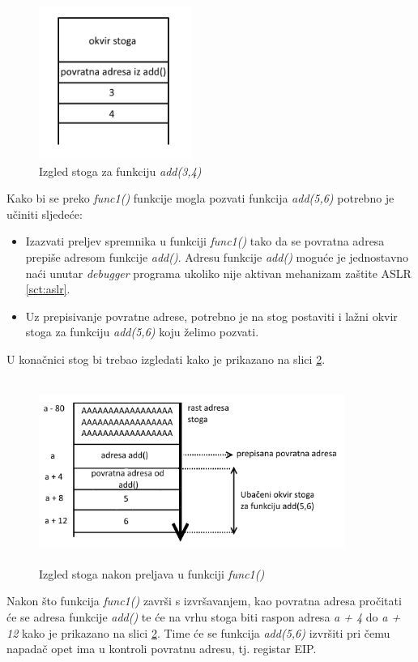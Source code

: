 \documentclass[times, utf8, diplomski, numeric]{fer}
\begin{document}
\begin{figure}[!htb]
\centering
\setlength\fboxsep{0pt}
\setlength\fboxrule{0.5pt}
\includegraphics[width=5cm, height=5cm]{slike/rop_add34}
\caption{Izgled stoga za funkciju \emph{add(3,4)}}
\label{fig:rop_add34} 
\end{figure}
Kako bi se preko \emph{func1()} funkcije mogla pozvati funkcija \emph{add(5,6)} potrebno je učiniti sljedeće:
\begin{itemize}
\item Izazvati preljev spremnika u funkciji \emph{func1()} tako da se povratna adresa prepiše adresom funkcije \emph{add()}. Adresu funkcije \emph{add()} moguće je jednostavno naći unutar \emph{debugger} programa ukoliko nije aktivan mehanizam zaštite ASLR \ref{sct:aslr}.
\item Uz prepisivanje povratne adrese, potrebno je na stog postaviti i lažni okvir stoga za funkciju \emph{add(5,6)} koju želimo pozvati.
\end{itemize}
U konačnici stog bi trebao izgledati kako je prikazano na slici \ref{fig:rop_add56}.

\begin{figure}[!htb]
\centering
\setlength\fboxsep{0pt}
\setlength\fboxrule{0.5pt}
\includegraphics[width=10cm, height=6cm]{slike/rop_add56}
\caption{Izgled stoga nakon preljava u funkciji \emph{func1()}}
\label{fig:rop_add56} 
\end{figure}
Nakon što funkcija \emph{func1()} završi s izvršavanjem, kao povratna adresa pročitati će se adresa funkcije \emph{add()} te će na vrhu stoga biti raspon adresa \emph{a + 4} do \emph{a + 12} kako je prikazano na slici \ref{fig:rop_add56}. Time će se funkcija \emph{add(5,6)} izvršiti pri čemu napadač opet ima u kontroli povratnu adresu, tj. registar EIP.
\end{document}
